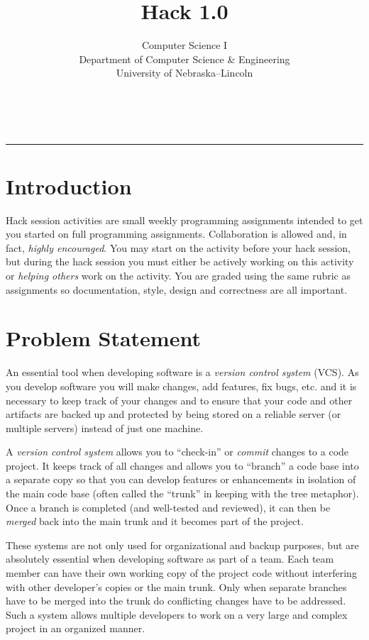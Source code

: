 \documentclass[12pt]{scrartcl}
\title{Hack 1.0}\let\Title\@title
\subtitle{Computer Science I\\
{\small
\vskip1cm
Department of Computer Science \& Engineering \\
University of Nebraska--Lincoln}
\vskip-1cm}
\date{~}
\begin{document}
\maketitle

\hrule

\section*{Introduction}

Hack session activities are small weekly programming assignments intended
to get you started on full programming assignments.  Collaboration is allowed
and, in fact, \emph{highly encouraged}.  You may start on the activity before
your hack session, but during the hack session you must either be actively 
working on this activity or \emph{helping others} work on the activity.
You are graded using the same rubric as assignments so documentation, style, 
design and correctness are all important.  

\section*{Problem Statement}

An essential tool when developing software is a \emph{version control system}
(VCS).  As you develop software you will make changes, add features, fix bugs, etc.
and it is necessary to keep track of your changes and to ensure that your 
code and other artifacts are backed up and protected by being stored on a 
reliable server (or multiple servers) instead of just one machine.  

A \emph{version control system} allows you to ``check-in'' or 
\emph{commit} changes to a code project.  It keeps track of all changes 
and allows you to ``branch'' a code base into a separate copy so that 
you can develop features or enhancements in isolation of the
main code base (often called the ``trunk'' in keeping with the tree 
metaphor).  Once a branch is completed (and well-tested and 
reviewed), it can then be \emph{merged} back into the main trunk 
and it becomes part of the project.

These systems are not only used for organizational and backup 
purposes, but are absolutely essential when developing software 
as part of a team.  Each team member can have their own working 
copy of the project code without interfering with other developer's 
copies or the main trunk.  Only when separate branches have to 
be merged into the trunk do conflicting changes have to be addressed.  
Such a system allows multiple developers to work on a 
very large and complex project in an organized manner.
\end{document}
